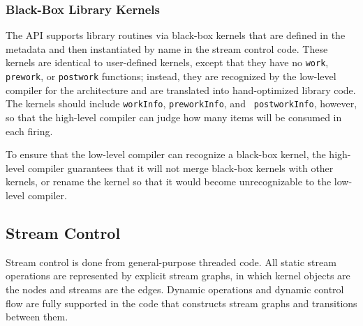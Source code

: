 \subsubsection{Black-Box Library Kernels}
\label{sec:kernelllc}

The API supports library routines via black-box kernels that are
defined in the metadata and then instantiated by name in the stream
control code.  These kernels are identical to user-defined kernels,
except that they have no {\tt work}, {\tt prework}, or {\tt postwork}
functions; instead, they are recognized by the low-level compiler for
the architecture and are translated into hand-optimized library code.
The kernels should include {\tt workInfo}, {\tt preworkInfo}, and {\tt
postworkInfo}, however, so that the high-level compiler can judge how
many items will be consumed in each firing.

To ensure that the low-level compiler can recognize a black-box
kernel, the high-level compiler guarantees that it will not merge
black-box kernels with other kernels, or rename the kernel so that it
would become unrecognizable to the low-level compiler.

\subsection{Stream Control}
\label{sec:graphs}

Stream control is done from general-purpose threaded code.  All static
stream operations are represented by explicit stream graphs, in which
kernel objects are the nodes and streams are the edges.  Dynamic
operations and dynamic control flow are fully supported in the code
that constructs stream graphs and transitions between them.

